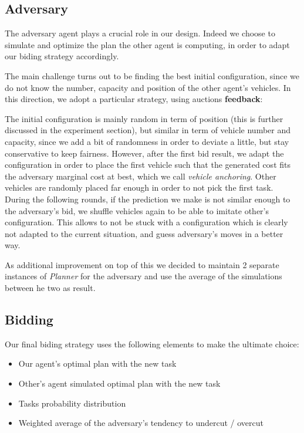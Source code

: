 \documentclass[11pt]{article}
\begin{document}
\subsection{Adversary}
The adversary agent plays a crucial role in our design. Indeed we choose to simulate and optimize the plan the other agent is computing, in order to adapt our biding strategy accordingly.

The main challenge turns out to be finding the best initial configuration, since we do not know the number, capacity and position of the other agent's vehicles. In this direction, we adopt a particular strategy, using auctions \textbf{feedback}:

The initial configuration is mainly random in term of position (this is further discussed in the experiment section), but similar in term of vehicle number and capacity, since we add a bit of randomness in order to deviate a little, but stay conservative to keep fairness. However, after the first bid result, we adapt the configuration in order to place the first vehicle such that the generated cost fits the adversary marginal cost at best, which we call \textit{vehicle anchoring}. Other vehicles are randomly placed far enough in order to not pick the first task. During the following rounds, if the prediction we make is not similar enough to the adversary's bid, we shuffle vehicles again to be able to imitate other's configuration. This allows to not be stuck with a configuration which is clearly not adapted to the current situation, and guess adversary's moves in a better way.

As additional improvement on top of this we decided to maintain 2 separate instances of \textit{Planner} for the adversary and use the average of the simulations between he two as result.


\subsection{Bidding}
Our final biding strategy uses the following elements to make the ultimate choice:
\begin{itemize}
	\item Our agent's optimal plan with the new task
	\item Other's agent simulated optimal plan with the new task
	\item Tasks probability distribution
	\item Weighted average of the adversary's tendency to undercut / overcut
\end{itemize}
\end{document}
